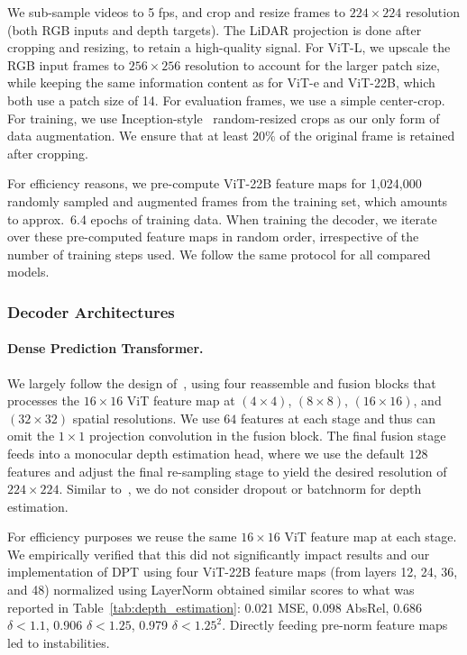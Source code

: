 \documentclass{article}
\begin{document}
We sub-sample videos to 5 fps, and crop and resize frames to $224\times224$ resolution (both RGB inputs and depth targets). The LiDAR projection is done after cropping and resizing, to retain a high-quality signal. For ViT-L, we upscale the RGB input frames to $256\times256$ resolution to account for the larger patch size, while keeping the same information content as for ViT-e and ViT-22B, which both use a patch size of 14. For evaluation frames, we use a simple center-crop. For training, we use Inception-style~\citep{szegedy2015going} random-resized crops as our only form of data augmentation. We ensure that at least $20\%$ of the original frame is retained after cropping.

For efficiency reasons, we pre-compute ViT-22B feature maps for 1,024,000 randomly sampled and augmented frames from the training set, which amounts to approx.~6.4 epochs of training data. When training the decoder, we iterate over these pre-computed feature maps in random order, irrespective of the number of training steps used. We follow the same protocol for all compared models.

\subsubsection{Decoder Architectures}

\paragraph{Dense Prediction Transformer.}

We largely follow the design of~\citep{ranftl2021vision}, using four reassemble and fusion blocks that processes the $16\times16$ ViT feature map at $(4\times4)$, $(8\times8)$, $(16\times16)$, and $(32\times32)$ spatial resolutions.
We use $64$ features at each stage and thus can omit the $1\times1$ projection convolution in the fusion block. 
The final fusion stage feeds into a monocular depth estimation head, where we use the default $128$ features and adjust the final re-sampling stage to yield the desired resolution of $224\times224$.
Similar to~\citep{ranftl2021vision}, we do not consider dropout or batchnorm for depth estimation.

For efficiency purposes we reuse the same $16\times16$ ViT feature map at each stage.
We empirically verified that this did not significantly impact results and our implementation of DPT using four ViT-22B feature maps (from layers 12, 24, 36, and 48) normalized using LayerNorm obtained similar scores to what was reported in Table~\ref{tab:depth_estimation}: $0.021$ MSE, $0.098$ AbsRel, $0.686$ $\delta < 1.1$, 0.906 $\delta < 1.25$, 0.979 $\delta < 1.25^2$.
Directly feeding pre-norm feature maps led to instabilities.
\end{document}
